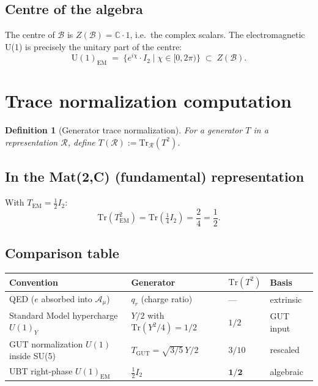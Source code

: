\documentclass[11pt,a4paper]{article}
\newtheorem{definition}[proposition]{Definition}
\begin{document}
\subsection{Centre of the algebra}

The centre of $\mathcal{B}$ is $Z(\mathcal{B})=\mathbb{C}\cdot 1$, i.e.\
the complex scalars.  The electromagnetic U(1) is precisely the unitary part
of the centre:
\begin{equation}
  \mathrm{U}(1)_{\mathrm{EM}}\;=\;\bigl\{e^{i\chi}\cdot I_2\;\bigr|\;\chi\in[0,2\pi)\bigr\}
  \;\subset\; Z(\mathcal{B}).
\end{equation}

\section{Trace normalization computation}

\begin{definition}[Generator trace normalization]
For a generator $T$ in a representation $\mathcal{R}$, define
$T(\mathcal{R}) := \mathrm{Tr}_{\mathcal{R}}(T^2)$.
\end{definition}

\subsection{In the Mat(2,C) (fundamental) representation}

With $T_{\mathrm{EM}}=\tfrac{1}{2}I_2$:
\begin{equation}
  \mathrm{Tr}\!\left(T_{\mathrm{EM}}^2\right)
  =\mathrm{Tr}\!\left(\tfrac{1}{4}I_2\right)
  =\frac{2}{4}=\frac{1}{2}.
\end{equation}

\subsection{Comparison table}

\begin{center}
\begin{tabular}{@{}llll@{}}
\toprule
Convention & Generator & $\mathrm{Tr}(T^2)$ & Basis \\
\midrule
QED ($e$ absorbed into $\mathcal{A}_\mu$)
  & $q_r$ (charge ratio) & — & extrinsic \\
Standard Model hypercharge $U(1)_Y$
  & $Y/2$ with $\mathrm{Tr}(Y^2/4)=1/2$
  & $1/2$ & GUT input \\
GUT normalization $U(1)$ inside SU(5)
  & $T_{\mathrm{GUT}}=\sqrt{3/5}\,Y/2$
  & $3/10$ & rescaled \\
UBT right-phase $U(1)_{\mathrm{EM}}$
  & $\tfrac{1}{2}I_2$
  & $\mathbf{1/2}$ & algebraic \\
\bottomrule
\end{tabular}
\end{center}
\end{document}
